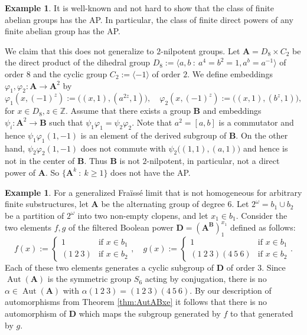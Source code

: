 \documentclass[12pt,a4paper,reqno]{amsart}
\numberwithin{equation}{section}
\theoremstyle{plain}
\theoremstyle{definition}
\newtheorem{exa}[thm]{Example}
\newcommand{\A}{\mathbf{A}}
\newcommand{\B}{\mathbf{B}}
\newcommand{\D}{\mathbf{D}}
\newcommand{\Z}{\mathbb{Z}}
\DeclareMathOperator{\Aut}{Aut}
\newcommand{\st}{\: :\:}
\begin{document}
\begin{exa}
 It is well-known and not hard to show that the class of finite abelian groups has the AP. In particular, the class of
 finite direct powers of any finite abelian group has the AP.

 We claim that this does not generalize to $2$-nilpotent groups. Let $\A = D_8\times C_2$ be the direct product
 of the dihedral group $D_8 := \langle a,b \st a^4=b^2=1, a^b = a^{-1}\rangle$ of order $8$ and the cyclic group
 $C_2:=\langle -1\rangle$ of order $2$.
 We define embeddings $\varphi_1,\varphi_2\colon \A\to\A^2$ by
\[
  \varphi_1(x,(-1)^z) := \bigl((x,1),(a^{2z},1)\bigr), \quad \varphi_2(x,(-1)^z) := \bigl((x,1),(b^z,1)\bigr),
\]
 for $x\in D_8, z\in\Z$.   
 Assume that there exists a group $\B$ and embeddings $\psi_i\colon \A^2\to\B$ such that
 $\psi_1\varphi_1=\psi_2\varphi_2$.
 Note that $a^2 = [a,b]$ is a commutator and hence $\psi_1\varphi_1(1,-1)$ is an element of the derived subgroup of $\B$.
 On the other hand, $\psi_2\varphi_2(1,-1)$ does not commute with $\psi_2 \bigl((1,1),(a,1)\bigr)$ and hence is not in
 the center of $\B$. Thus $\B$ is not $2$-nilpotent, in particular, not a direct power of $\A$.
 So $\{\A^k \st k\geq 1 \}$ does not have the AP.
\end{exa}


\begin{exa}
 For a generalized Fra{\"i}ss{\'e} limit that is not homogeneous for arbitrary finite substructures,
 let $\A$ be the alternating group of degree $6$.
 Let $2^\omega=b_1\cup b_2$ be a partition of $2^\omega$ into two non-empty clopens, and let $x_1\in b_1$.
 Consider the  two elements $f,g$ of the filtered Boolean power $\D=(\A^\B)^{x_1}_1$ defined as follows:
\[
f(x):=\begin{cases} 1 & \text{if } x\in b_1\\ (1\: 2\: 3) & \text{if } x\in b_2\end{cases},\quad
g(x):=\begin{cases} 1 & \text{if } x\in b_1\\ (1\: 2\: 3)(4\: 5\: 6) & \text{if } x\in b_2\end{cases}.
\]
Each of these two elements generates a cyclic subgroup of $\D$ of order $3$.
Since $\Aut(\A)$ is the symmetric group $S_6$ acting by conjugation,  
there is no $\alpha\in \Aut(\A)$ with $\alpha(1\: 2\: 3)=(1\: 2\: 3)(4\: 5\: 6)$.
By our description of automorphisms from Theorem \ref{thm:AutABxe} it follows that
there is no automorphism of $\D$ which maps the subgroup generated by $f$ to that generated by $g$. 
\end{exa}
\end{document}
